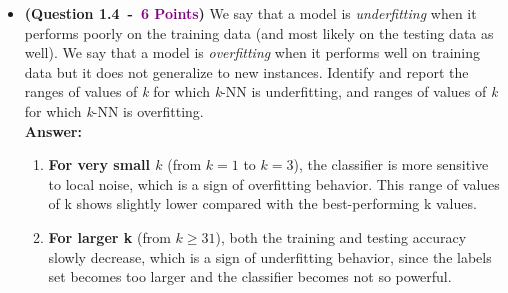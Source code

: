 \documentclass{article}
\newcommand{\POINTS}[1]{\textcolor{purple}{\textbf{{#1}}}}
\begin{document}
\begin{itemize}
\begin{enumerate}
\item \textbf{For the testing-set accuracy curve (normalized)}, the accuracy acts like the training-set accuracy curve, imporved form $k=1$ to a small k, then stays near its peak, and finially decreased slowly as k becomes larger.\\
In this dataset, the curve is flat and high (almost above 95\%), which suggests that the classed are doing well on separated data.

\item \textbf{Error bars} are generally larger for the testing-set curve than for the training-set curve.\\
This is because the testing set is smaller and the test accuracy is more sensitive to the random splite and noise, while the training-set accuracy is more stable.\\
\end{enumerate}
        \item \textbf{(Question 1.4~-~\POINTS{6 Points})} We say that a model is \textit{underfitting} when it performs poorly on the training data (and most likely on the testing data as well). We say that a model is \textit{overfitting} when it performs well on training data but it does not generalize to new instances. Identify and report the ranges of values of \textit{k} for which \textit{k}-NN is underfitting, and ranges of values of \textit{k} for which \textit{k}-NN is overfitting.
\\
\textbf{Answer:}
\begin{enumerate}
Based on the training and testing curves, the model does not show very "overfitting" or "underfitting" on the dataset, since the both accuracies maintains high ($\ge 95\%$), but we still can interpreted some range of values of k as overfitting or underfitting.

\item \textbf{For very small $k$} (from $k=1$ to $k=3$), the classifier is more sensitive to local noise, which is a sign of overfitting behavior. This range of values of k shows slightly lower compared with the best-performing k values.

\item \textbf{For larger k} (from $k\ge 31$), both the training and testing accuracy slowly decrease, which is a sign of underfitting behavior, since the labels set becomes too larger and the classifier becomes not so powerful.


\end{enumerate}
\end{itemize}
\end{document}
